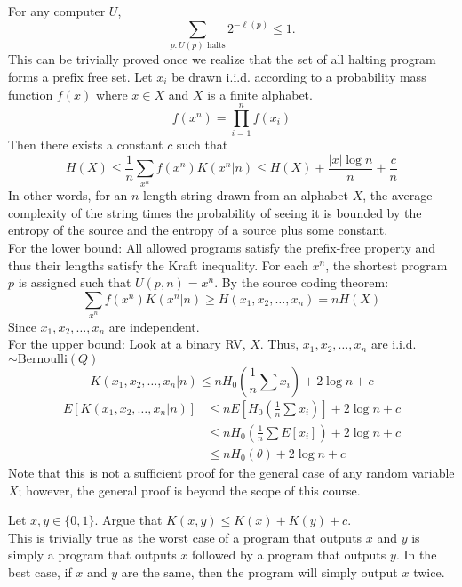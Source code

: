 \documentclass[11pt]{article}
\theoremstyle{definition}
\begin{document}
\theorem For any computer $U$, $$\sum_{p : U(p) \text{ halts}} 2^{-\ell(p)} \le 1.$$
This can be trivially proved once we realize that the set of all halting program forms a prefix free set. 
\theorem Let $x_i$ be drawn i.i.d. according to a probability mass function $f(x)$ where $x \in X$ and $X$ is a finite alphabet.  
$$f(x^n) = \prod_{i = 1}^{n} f(x_i)$$
Then there exists a constant $c$ such that
$$H(X) \leq \frac 1n \sum_{x^n} f(x^n) K(x^n|n) \leq H(X) + \frac{|x|\log{n}}{n} + \frac{c}{n}$$
In other words, for an $n$-length string drawn from an alphabet $X$, the average complexity of the string times the probability of seeing it is bounded by the entropy of the source and the entropy of a source plus some constant.\\
\proof For the lower bound: All allowed programs satisfy the prefix-free property and thus their lengths satisfy the Kraft inequality. For each $x^n$, the shortest program $p$ is assigned such that $U(p, n) = x^n$.  By the source coding theorem:
$$\sum_{x^n} f(x^n) K(x^n|n) \geq H(x_1, x_2, \dots, x_n) = n H(X)$$
Since $x_1, x_2, \dots, x_n$ are independent.\\
For the upper bound:  Look at a binary RV, $X$. Thus, $x_1, x_2, \dots, x_n$ are i.i.d. $\sim \mathrm{Bernoulli}(Q)$
$$K(x_1, x_2, \dots, x_n | n) \leq n H_0 (\frac 1n \sum x_i) + 2 \log n + c$$
\begin{align*}
E[K(x_1, x_2, \dots, x_n | n)] 	&\leq n E[H_0 (\frac 1n \sum x_i)] + 2 \log n + c\\
					 	&\leq n H_0(\frac 1n \sum E[x_i]) + 2 \log n + c\\
						&\leq n H_0(\theta) + 2 \log n + c
\end{align*}
Note that this is not a sufficient proof for the general case of any random variable $X$; however, the general proof is beyond the scope of this course.

\example Let $x, y \in \{0, 1\}$. Argue that $K(x, y) \leq K(x) + K(y) + c$. \\
This is trivially true as the worst case of a program that outputs $x$ and $y$ is simply a program that outputs $x$ followed by a program that outputs $y$. In the best case, if $x$ and $y$ are the same, then the program will simply output $x$ twice. 
\end{document}
